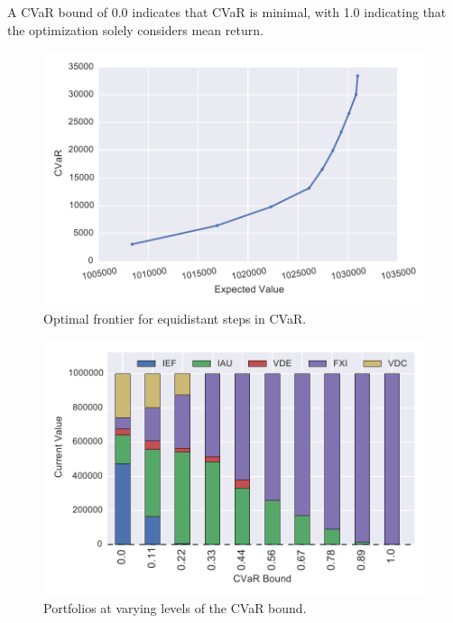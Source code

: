 A CVaR bound of 0.0 indicates that CVaR is minimal, with 1.0 indicating that the optimization solely considers mean return.


\begin{figure}[tp]
\centering
\includegraphics{../pic/frontier.pdf}
\caption{Optimal frontier for equidistant steps in CVaR.}
\label{fig:frontier}
\end{figure}

\begin{figure}[tp]
\centering
\includegraphics{../pic/Stake_vs_CVaR.pdf}
\caption{Portfolios at varying levels of the CVaR bound.}
\label{fig:scenarioreturn}
\end{figure}

